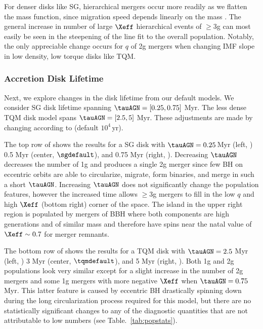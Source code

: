 For denser disks like SG, hierarchical mergers occur more readily as we flatten the mass function, since migration speed depends linearly on the mass \citep{McKernan+25-mcfactsI}.
The general increase in number of large $\Xeff$ hierarchical events of $\geq$3g can most easily be seen in the steepening of the line fit to the overall population.
Notably, the only appreciable change occurs for $q$ of 2g mergers when changing IMF slope in low density, low torque disks like TQM.


\subsubsection{Accretion Disk Lifetime}
Next, we explore changes in the disk lifetime from our default models.
We consider SG disk lifetime spanning $\tauAGN=[0.25,0.75]$ Myr.
The less dense TQM disk model spans $\tauAGN=[2.5,5]$ Myr.
These adjustments are made by changing  according to  (default $10^4\,$yr).

The top row of  shows the results for a SG disk with $\tauAGN=0.25\,$Myr (left, ) 0.5 Myr (center, $\sgdefault$), and 0.75 Myr (right, ).
Decreasing $\tauAGN$ decreases the number of 1g and produces a single 2g merger since few BH on eccentric orbits are able to circularize, migrate, form binaries, and merge in such a short $\tauAGN$.
Increasing $\tauAGN$ does not significantly change the population features, however the increased time allows $\geq$3g mergers to fill in the low $q$ and high $\Xeff$ (bottom right) corner of the space.
The island in the upper right region is populated by mergers of BBH where both components are high generations and of similar mass and therefore have spins near the natal value of $\Xeff \sim 0.7$ for merger remnants.

The bottom row of  shows the results for a TQM disk with $\tauAGN=2.5$ Myr (left, ) 3 Myr (center, $\tqmdefault$), and 5 Myr (right, ).
Both 1g and 2g populations look very similar except for a slight increase in the number of 2g mergers and some 1g mergers with more negative $\Xeff$ when $\tauAGN=0.75$ Myr.
This latter feature is caused by eccentric BH drastically spinning down during the long circularization process required for this model, but there are no statistically significant changes to any of the diagnostic quantities that are not attributable to low numbers (see Table.~\ref{tab:popstats}).

